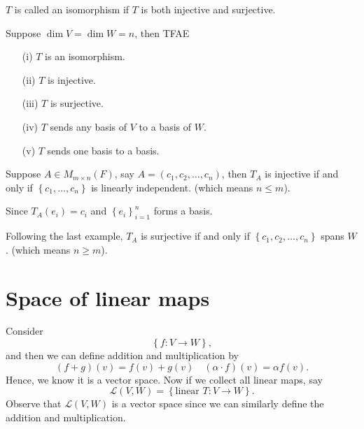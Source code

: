 \begin{prev}
    \(T\) is called an isomorphism if \(T\) is both injective and surjective.  
\end{prev}
\begin{proposition} \label{prop: isomorphism TFAE}
    Suppose \(\dim V = \dim W = n\), then TFAE 
    \begin{itemize}
        \item [(i)] \(T\) is an isomorphism. 
        \item [(ii)] \(T\) is injective.  
        \item [(iii)] \(T\) is surjective.  
        \item [(iv)] \(T\) sends any basis of \(V\) to a basis of \(W\).   
        \item [(v)] \(T\) sends one basis to a basis. 
    \end{itemize} 
\end{proposition}

\begin{eg}
    Suppose \(A \in M_{m \times n}(F)\), say \(A = (c_1, c_2, \dots , c_n)\), then \(T_A\) is injective if and only if \(\left\{ c_1, \dots , c_n \right\} \) is linearly independent. (which means \(n \le m\)).
\end{eg}
\begin{explanation}
    Since \(T_A(e_i) = c_i\) and \(\left\{ e_i \right\}_{i=1}^n \) forms a basis. 
\end{explanation}

\begin{eg}
    Following the last example, \(T_A\) is surjective if and only if \(\left\{ c_1, c_2, \dots , c_n \right\} \) spans \(W\). (which means \(n \ge m\)).   
\end{eg}

\section{Space of linear maps}
Consider 
\[
    \left\{ f:V \to W \right\}, 
\] and then we can define addition and multiplication by 
\[
    (f + g)(v) = f(v) + g(v) \quad (\alpha\cdot f)(v) = \alpha f(v).
\]
Hence, we know it is a vector space. Now if we collect all linear maps, say 
\[
    \mathcal{L} (V, W) = \left\{ \text{linear } T: V \to W \right\}. 
\]
Observe that \(\mathcal{L} (V, W)\) is a vector space since we can similarly define the addition and multiplication. 

